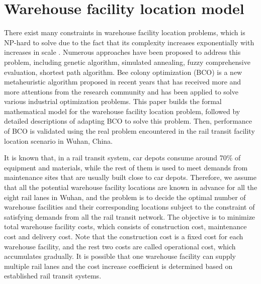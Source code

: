   \section{Warehouse facility location model}
There exist many constraints in warehouse facility location problems\citep{c1, c2}, which is NP-hard to solve due to the fact that its complexity increases exponentially with increases in scale \citep{c3}.
Numerous approaches have been proposed to address this problem, including genetic algorithm, simulated annealing, fuzzy comprehensive evaluation, shortest path algorithm.
Bee colony optimization (BCO) \citep{c4} is a new metaheuristic algorithm proposed in recent years that has received more and more attentions from the research community and has been applied to solve various industrial optimization problems.
This paper builds the formal mathematical model for the warehouse facility location problem, followed by detailed descriptions of adapting BCO to solve this problem.
Then, performance of BCO is validated using the real problem encountered in the rail transit facility location scenario in Wuhan, China.

It is known that, in a rail transit system, car depots consume around 70\% of equipment and materials, while the rest of them is used to meet demands from maintenance sites that are usually built close to car depots.
Therefore, we assume that all the potential warehouse facility locations are known in advance for all the eight rail lanes in Wuhan, and the problem is to decide the optimal number of warehouse facilities and their corresponding locations subject to the constraint of satisfying demands from all the rail transit network.
The objective is to minimize total warehouse facility costs, which consists of construction cost, maintenance cost and delivery cost.
Note that the construction cost is a fixed cost for each warehouse facility, and the rest two costs are called operational cost, which accumulates gradually.
It is possible that one warehouse facility can supply multiple rail lanes and the cost increase coefficient is determined based on established rail transit systems.


